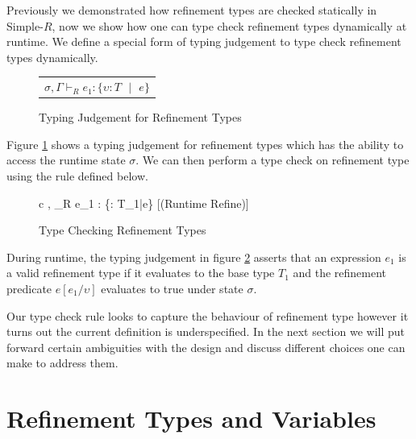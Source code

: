 \documentclass[a4paper,12pt]{report}
\begin{document}
\par
Previously we demonstrated how refinement types are checked statically in Simple-$R$,
now we show how one can type check refinement types dynamically at runtime. We 
define a special form of typing judgement to type check refinement types 
dynamically.


\begin{figure}[H]
  \begin{center}
    \begin{tabular} {c}
      $\sigma, \Gamma \vdash_{R} e_1 : \{\upsilon : T \text{ }|\text{ }e\}$
    \end{tabular}
  \end{center}
  \caption{Typing Judgement for Refinement Types}
  \label{fig:refine_judgement}
\end{figure}

\par
Figure \ref{fig:refine_judgement} shows a typing judgement for refinement 
types which has the ability to access the runtime state $\sigma$. We can then 
perform a type check on refinement type using the rule defined below. 

\begin{figure}[H]
  \begin{center}
    \begin{tabular} {c}
      {\sigma, \Gamma \vdash_{R} e_1 : \{\upsilon : T_1\text{ }|\text{ }e\}} [(Runtime Refine)]
    \end{tabular}
  \end{center}
  \caption{Type Checking Refinement Types}
  \label{fig:refine_typecheck}
\end{figure}

\par
During runtime, the typing judgement in figure \ref{fig:refine_typecheck} 
asserts that an expression $e_1$ is a valid refinement type if it 
evaluates to the base type $T_1$ and the refinement predicate $e[e_1/\upsilon]$ 
evaluates to true under state $\sigma$.

\par
Our type check rule looks to capture the behaviour of refinement type however it 
turns out the current definition is underspecified. In the next section we 
will put forward certain ambiguities with the design and discuss different choices 
one can make to address them.

\section{Refinement Types and Variables}
\end{document}
